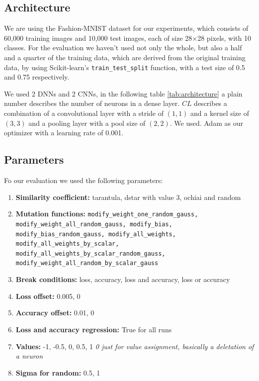 \subsection*{Architecture}
We are using the Fashion-MNIST dataset\cite{xiao_fashion-mnist_2017} for our experiments, which consists of 60,000 training images and 10,000 test images, each of size 28×28 pixels, with 10 classes.
For the evaluation we haven't used not only the whole, but also a half and a quarter of the training data, which are derived from the original training data, by using Scikit-learn's\cite{pedregosa_scikit-learn_2011} \texttt{train\_test\_split} function, with a test size of 0.5 and 0.75 respectively.

We used 2 DNNs and 2 CNNs, in the following table \ref{tab:architecture} a plain number describes the number of neurons in a dense layer. $CL$ describes a combination of a convolutional layer with a stride of $(1,1)$ and a kernel size of $(3,3)$ and a pooling layer with a pool size of $(2,2)$. We used.
Adam as our optimizer with a learning rate of 0.001.

\subsection*{Parameters}
Fo our evaluation we used the following parameters:
\begin{enumerate}
    \item[]\textbf{Similarity coefficient:} tarantula, dstar with value 3, ochiai and random
    \item[]\textbf{Mutation functions:} \texttt{modify\_weight\_one\_random\_gauss,\\ modify\_weight\_all\_random\_gauss, modify\_bias, modify\_bias\_random\_gauss, modify\_all\_weights, modify\_all\_weights\_by\_scalar,\\modify\_all\_weights\_by\_scalar\_random\_gauss,\\modify\_weight\_all\_random\_by\_scalar\_gauss}
    \item[]\textbf{Break conditions:} loss, accuracy, loss and accuracy, loss or accuracy
    \item[]\textbf{Loss offset:} 0.005, 0
    \item[]\textbf{Accuracy offset:} 0.01, 0
    \item[]\textbf{Loss and accuracy regression:} True for all runs
    \item[]\textbf{Values:} -1, -0.5, 0, 0.5, 1 \textit{0 just for value assignment, basically a deletation of a neuron}
    \item[]\textbf{Sigma for random:} 0.5, 1
\end{enumerate}
